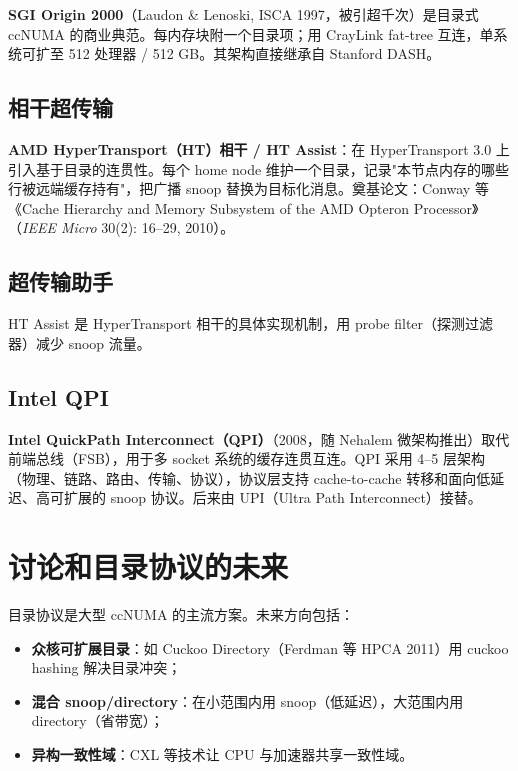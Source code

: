 \textbf{SGI Origin 2000}（Laudon \& Lenoski, ISCA 1997，被引超千次）是目录式 ccNUMA 的商业典范。每内存块附一个目录项；用 CrayLink fat-tree 互连，单系统可扩至 512 处理器 / 512 GB。其架构直接继承自 Stanford DASH。

\subsection{相干超传输}

\textbf{AMD HyperTransport（HT）相干 / HT Assist}：在 HyperTransport 3.0 上引入基于目录的连贯性。每个 home node 维护一个目录，记录"本节点内存的哪些行被远端缓存持有"，把广播 snoop 替换为目标化消息。奠基论文：Conway 等《Cache Hierarchy and Memory Subsystem of the AMD Opteron Processor》（\emph{IEEE Micro} 30(2): 16–29, 2010）。

\subsection{超传输助手}

HT Assist 是 HyperTransport 相干的具体实现机制，用 probe filter（探测过滤器）减少 snoop 流量。

\subsection{Intel QPI}

\textbf{Intel QuickPath Interconnect（QPI）}（2008，随 Nehalem 微架构推出）取代前端总线（FSB），用于多 socket 系统的缓存连贯互连。QPI 采用 4–5 层架构（物理、链路、路由、传输、协议），协议层支持 cache-to-cache 转移和面向低延迟、高可扩展的 snoop 协议。后来由 UPI（Ultra Path Interconnect）接替。

\section{讨论和目录协议的未来}

目录协议是大型 ccNUMA 的主流方案。未来方向包括：

\begin{itemize}
\item \textbf{众核可扩展目录}：如 Cuckoo Directory（Ferdman 等 HPCA 2011）用 cuckoo hashing 解决目录冲突；
\item \textbf{混合 snoop/directory}：在小范围内用 snoop（低延迟），大范围内用 directory（省带宽）；
\item \textbf{异构一致性域}：CXL 等技术让 CPU 与加速器共享一致性域。
\end{itemize}


